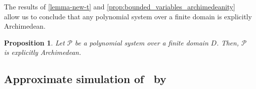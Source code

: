 \documentclass[11pt]{article}
\newtheorem{definition}[theorem]{Definition}
\newtheorem{proposition}[theorem]{Proposition}
\begin{document}
The results of \cref{lemma-new-t} and \cref{prop:bounded_variables_archimedeanity} allow us to conclude that any polynomial system over a finite domain is explicitly Archimedean.
\begin{proposition}\label{prop:finite-archi}
    Let $\mathcal{P}$ be a polynomial system over a finite domain $D$. Then, $\mathcal{P}$ is explicitly Archimedean.
\end{proposition} 



\subsection{Approximate simulation of \PC\ by \sos}\label{sect:proof_sos_sim_PC}
\end{document}
